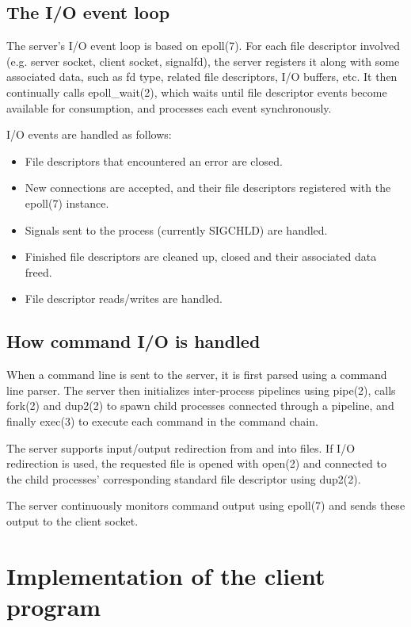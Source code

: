 \documentclass[12pt]{article}
\begin{document}
\subsection{The I/O event loop}

The server's I/O event loop is based on epoll(7). For each file descriptor involved (e.g. server socket, client socket, signalfd), the server registers it along with some associated data, such as fd type, related file descriptors, I/O buffers, etc. It then continually calls epoll\_wait(2), which waits until file descriptor events become available for consumption, and processes each event synchronously.

I/O events are handled as follows:

\begin{itemize}
\item File descriptors that encountered an error are closed.
\item New connections are accepted, and their file descriptors registered with the epoll(7) instance.
\item Signals sent to the process (currently SIGCHLD) are handled.
\item Finished file descriptors are cleaned up, closed and their associated data freed.
\item File descriptor reads/writes are handled.
\end{itemize}

\subsection{How command I/O is handled}

When a command line is sent to the server, it is first parsed using a command line parser. The server then initializes inter-process pipelines using pipe(2), calls fork(2) and dup2(2) to spawn child processes connected through a pipeline, and finally exec(3) to execute each command in the command chain.

The server supports input/output redirection from and into files. If I/O redirection is used, the requested file is opened with open(2) and connected to the child processes' corresponding standard file descriptor using dup2(2).

The server continuously monitors command output using epoll(7) and sends these output to the client socket.


\section{Implementation of the client program}
\end{document}
